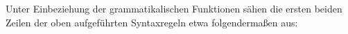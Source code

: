 \documentclass[12pt,a4paper]{article}
\begin{document}
Unter Einbeziehung der grammatikalischen Funktionen sähen die ersten beiden Zeilen der oben aufgeführten Syntaxregeln etwa folgendermaßen aus:
\end{document}
